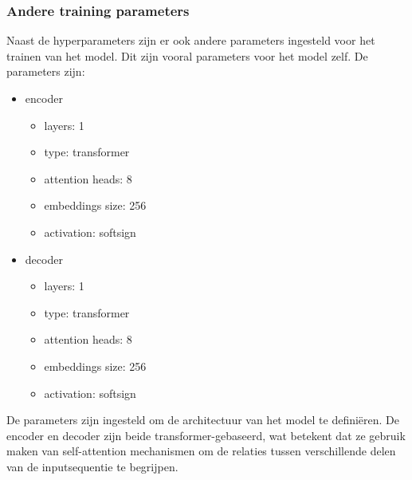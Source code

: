 \subsubsection{Andere training parameters}
Naast de hyperparameters zijn er ook andere parameters ingesteld voor het trainen van het model.
Dit zijn vooral parameters voor het model zelf.
De parameters zijn:
\begin{itemize}
  \item encoder
  \begin{itemize}
    \item layers: 1
    \item type: transformer
    \item attention heads: 8
    \item embeddings size: 256
    \item activation: softsign
  \end{itemize}
  \item decoder
  \begin{itemize}
    \item layers: 1
    \item type: transformer
    \item attention heads: 8
    \item embeddings size: 256
    \item activation: softsign
  \end{itemize}
\end{itemize}

De parameters zijn ingesteld om de architectuur van het model te definiëren.
De encoder en decoder zijn beide transformer-gebaseerd, wat betekent dat ze gebruik maken van self-attention mechanismen om de relaties tussen verschillende delen van de inputsequentie te begrijpen.


